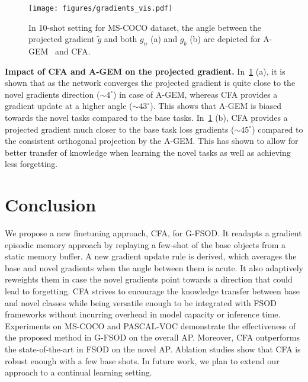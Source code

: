 \documentclass[10pt,twocolumn,letterpaper]{article}
\begin{document}
 \begin{figure}[t!]
 \centering
 \texttt{[image: figures/gradients\_vis.pdf]}\vspace{-2mm}
 \caption{In 10-shot setting for MS-COCO dataset, the angle between the projected gradient $\tilde{g}$ and both $g_n$ (a) and $g_b$ (b) are depicted for A-GEM~\cite{agem} and CFA.\vspace{-1em}} \label{fig:agem_cfa_comparisons}\vspace{-2mm}
\end{figure}

 \textbf{Impact of CFA and A-GEM on the projected gradient.} In~\cref{fig:agem_cfa_comparisons} (a), it is shown that as the network converges the projected gradient is quite close to the novel gradients direction ($\sim 4^\circ$) in case of A-GEM, whereas CFA provides a gradient update at a higher angle ($\sim 43^\circ$). This shows that A-GEM is biased towards the novel tasks compared to the base tasks. In~\cref{fig:agem_cfa_comparisons} (b), CFA provides a projected gradient much closer to the base task loss gradients ($\sim 45^\circ$) compared to the consistent orthogonal projection by the A-GEM. This has shown to allow for better transfer of knowledge when learning the novel tasks as well as achieving less forgetting. 


\section{Conclusion}
We propose a new finetuning approach, CFA, for G-FSOD. It readapts a gradient episodic memory approach by replaying a few-shot of the base objects from a static memory buffer. A new gradient update rule is derived, which averages the base and novel gradients when the angle between them is acute. It also adaptively reweights them in case the novel gradients point towards a direction that could lead to forgetting. CFA strives to encourage the knowledge transfer between base and novel classes while being versatile enough to be integrated with FSOD frameworks without incurring overhead in model capacity or inference time. Experiments on MS-COCO and PASCAL-VOC demonstrate the effectiveness of the proposed method in G-FSOD on the overall AP. Moreover, CFA outperforms the state-of-the-art in FSOD on the novel AP. Ablation studies show that CFA is robust enough with a few base shots. In future work, we plan to extend our approach to a continual learning setting.    
\clearpage
{\small


}
\end{document}
